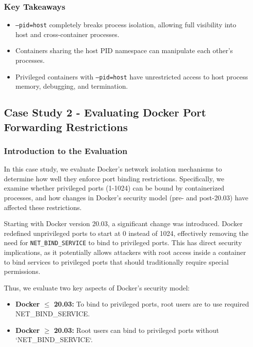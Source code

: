 \subsubsection{Key Takeaways}
\begin{itemize}
    \item \texttt{--pid=host} completely breaks process isolation, allowing full visibility into host and cross-container processes.
    \item Containers sharing the host PID namespace can manipulate each other’s processes.
    \item Privileged containers with \texttt{--pid=host} have unrestricted access to host process memory, debugging, and termination.
\end{itemize}










\subsection{Case Study 2 - Evaluating Docker Port Forwarding Restrictions}

\subsubsection{Introduction to the Evaluation}
In this case study, we evaluate Docker’s network isolation mechanisms to determine how well they enforce port binding restrictions. Specifically, we examine whether privileged ports (1-1024) can be bound by containerized processes, and how changes in Docker’s security model (pre- and post-20.03) have affected these restrictions.

Starting with Docker version 20.03, a significant change was introduced. Docker redefined unprivileged ports to start at 0 instead of 1024, effectively removing the need for \texttt{NET\_BIND\_SERVICE} to bind to privileged ports. This has direct security implications, as it potentially allows attackers with root access inside a container to bind services to privileged ports that should traditionally require special permissions.

Thus, we evaluate two key aspects of Docker’s security model:
\begin{itemize}
    \item \textbf{Docker $\mathbf{\leq}$ 20.03:} To bind to privileged ports, root users are to use required NET\_BIND\_SERVICE.
    \item \textbf{Docker $\mathbf{\geq}$ 20.03:} Root users can bind to privileged ports without `NET\_BIND\_SERVICE`.
\end{itemize}


